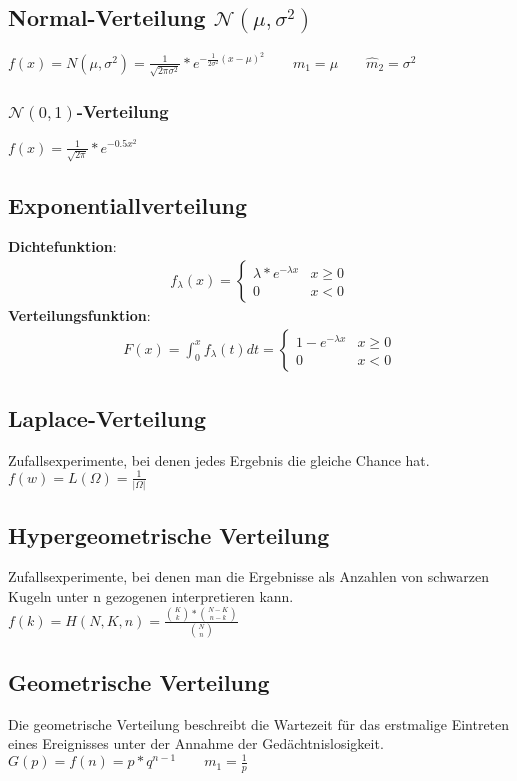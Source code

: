 \documentclass{article}
\begin{document}
\subsection{Normal-Verteilung $\mathcal{N}(\mu, \sigma^2)$}
$f(x) = N(\mu, \sigma^2) = \frac{1}{\sqrt{2\pi\sigma^2}}*e^{-\frac{1}{2\sigma^2}(x-		
\mu)^2} \quad \quad m_1 = \mu \quad \quad \widehat{m}_2=\sigma^2$
\subsubsection{$\mathcal{N}(0,1)$-Verteilung}
$f(x) = \frac{1}{\sqrt{2\pi}}*e^{-0.5x^2}$
\subsection{Exponentiallverteilung}
\textbf{Dichtefunktion}:
\begin{align} f_\lambda(x) =
	\begin{cases}
		\lambda*e^{-\lambda x} & x \geq 0 \\
		0                                     & x <    0
	\end{cases}
\end{align}
\textbf{Verteilungsfunktion}:
\begin{align} F(x) = \int_0^x f_\lambda(t) dt =
	\begin{cases}
		1 - e^{-\lambda x} & x \geq 0 \\
		0                                     & x <    0
	\end{cases}
\end{align}
\subsection{Laplace-Verteilung}
Zufallsexperimente, bei denen jedes Ergebnis die gleiche Chance hat. \\
$f(w) = L(\Omega) = \frac{1}{|\Omega|}$
\subsection{Hypergeometrische Verteilung}
Zufallsexperimente, bei denen man die Ergebnisse als Anzahlen von schwarzen Kugeln unter 	n gezogenen interpretieren kann. \\
$f(k) = H(N, K, n) = \frac{\binom{K}{k}*\binom{N-K}{n-k}}{\binom{N}{n}}$
\subsection{Geometrische Verteilung}
Die geometrische Verteilung beschreibt die Wartezeit für das erstmalige Eintreten
eines Ereignisses unter der Annahme der Ged\"achtnislosigkeit. \\
$G(p) = f(n) = p*q^{n-1} \quad \quad m_1 = \frac{1}{p}$
\end{document}
